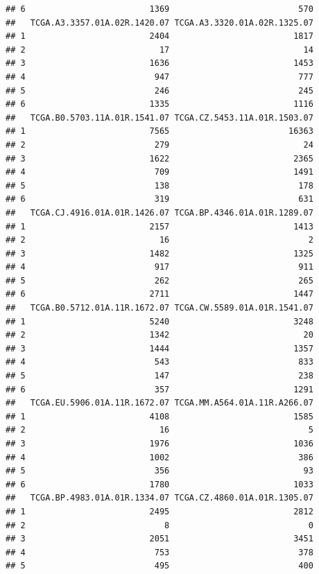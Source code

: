 \documentclass[
]{article}
\begin{document}
\begin{verbatim}
## 6                         1369                          570
##   TCGA.A3.3357.01A.02R.1420.07 TCGA.A3.3320.01A.02R.1325.07
## 1                         2404                         1817
## 2                           17                           14
## 3                         1636                         1453
## 4                          947                          777
## 5                          246                          245
## 6                         1335                         1116
##   TCGA.B0.5703.11A.01R.1541.07 TCGA.CZ.5453.11A.01R.1503.07
## 1                         7565                        16363
## 2                          279                           24
## 3                         1622                         2365
## 4                          709                         1491
## 5                          138                          178
## 6                          319                          631
##   TCGA.CJ.4916.01A.01R.1426.07 TCGA.BP.4346.01A.01R.1289.07
## 1                         2157                         1413
## 2                           16                            2
## 3                         1482                         1325
## 4                          917                          911
## 5                          262                          265
## 6                         2711                         1447
##   TCGA.B0.5712.01A.11R.1672.07 TCGA.CW.5589.01A.01R.1541.07
## 1                         5240                         3248
## 2                         1342                           20
## 3                         1444                         1357
## 4                          543                          833
## 5                          147                          238
## 6                          357                         1291
##   TCGA.EU.5906.01A.11R.1672.07 TCGA.MM.A564.01A.11R.A266.07
## 1                         4108                         1585
## 2                           16                            5
## 3                         1976                         1036
## 4                         1002                          386
## 5                          356                           93
## 6                         1780                         1033
##   TCGA.BP.4983.01A.01R.1334.07 TCGA.CZ.4860.01A.01R.1305.07
## 1                         2495                         2812
## 2                            8                            0
## 3                         2051                         3451
## 4                          753                          378
## 5                          495                          400

\end{verbatim}
\end{document}
